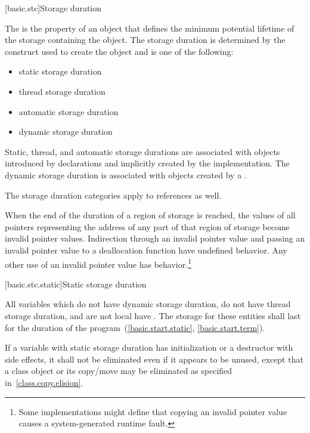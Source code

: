 [basic.stc]{Storage duration}

\pnum
{}%
The  is the property of an object that defines the minimum
potential lifetime of the storage containing the object. The storage
duration is determined by the construct used to create the object and is
one of the following:

\begin{itemize}
\item static storage duration
\item thread storage duration
\item automatic storage duration
\item dynamic storage duration
\end{itemize}

\pnum
{}%
%
%
%
Static, thread, and automatic storage durations are associated with objects
introduced by declarations and implicitly created by
the implementation. The dynamic storage duration
is associated with objects created by a
.

\pnum
The storage duration categories apply to references as well.

\pnum
When the end of the duration of a region of storage is reached,
the values of all pointers
representing the address of any part of that region of storage
become invalid pointer values.
Indirection through an invalid pointer value and
passing an invalid pointer value to a deallocation function
have undefined behavior.
Any other use of an invalid pointer value has
behavior.\footnote{Some implementations might define that
copying an invalid pointer value
causes a system-generated runtime fault.}

[basic.stc.static]{Static storage duration}

\pnum
{}%
All variables which do not have dynamic storage duration, do not have thread
storage duration, and are not local
have . The
storage for these entities shall last for the duration of the
program~(\ref{basic.start.static}, \ref{basic.start.term}).

\pnum
If a variable with static storage duration has initialization or a
destructor with side effects, it shall not be eliminated even if it
appears to be unused, except that a class object or its copy/move may be
eliminated as specified in~\ref{class.copy.elision}.

